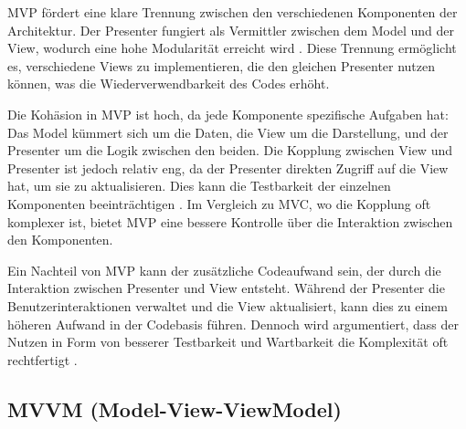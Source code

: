 MVP fördert eine klare Trennung zwischen den verschiedenen
Komponenten der Architektur. Der Presenter fungiert als Vermittler
zwischen dem Model und der View, wodurch eine hohe Modularität
erreicht wird \cite{qureshi2024}. Diese Trennung ermöglicht
es, verschiedene Views zu implementieren, die den gleichen
Presenter nutzen können, was die Wiederverwendbarkeit des Codes
erhöht.

Die Kohäsion in MVP ist hoch, da jede Komponente spezifische
Aufgaben hat: Das Model kümmert sich um die Daten, die View
um die Darstellung, und der Presenter um die Logik zwischen
den beiden. Die Kopplung zwischen View und Presenter ist
jedoch relativ eng, da der Presenter direkten Zugriff auf die
View hat, um sie zu aktualisieren. Dies kann die Testbarkeit
der einzelnen Komponenten beeinträchtigen \cite{aihara2012mvc}. Im
Vergleich zu MVC, wo die Kopplung oft komplexer ist, bietet
MVP eine bessere Kontrolle über die Interaktion zwischen den
Komponenten.

Ein Nachteil von MVP kann der zusätzliche Codeaufwand sein,
der durch die Interaktion zwischen Presenter und View entsteht.
Während der Presenter die Benutzerinteraktionen verwaltet und
die View aktualisiert, kann dies zu einem höheren Aufwand in
der Codebasis führen. Dennoch wird argumentiert, dass der
Nutzen in Form von besserer Testbarkeit und Wartbarkeit die
Komplexität oft rechtfertigt \cite{qureshi2024}. 

\subsection{MVVM (Model-View-ViewModel)}

